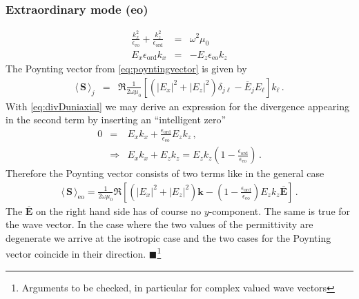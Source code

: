 \documentclass[12pt,a4paper,twoside,openright,BCOR10mm,headsepline,titlepage,abstracton,chapterprefix,final]{scrreprt}
\newcommand\Vector[1]{{\mathbf{#1}}}
\newcommand\vacuum{0}
\newcommand\wavenumber{k}
\newcommand\Wavevector{\Vector{\wavenumber}}
\newcommand\scalarEfield{E}
\newcommand\Efield{\Vector{\scalarEfield}}
\newcommand\vacuumpermeability{\mu_{\vacuum}}
\newcommand\scalarpermittivity{\epsilon}
\newcommand\ordi{\text{ord}}
\newcommand\eo{\text{eo}}
\newcommand{\timeavg}[1]{{\langle\,#1\,\rangle}}
\newcommand{\remark}[1]{{\color{red}$\blacksquare$}\footnote{{\color{red}#1}}}
\begin{document}
\subsubsection{Extraordinary mode (eo)}
\begin{eqnarray}
  \frac{\wavenumber_{x}^2 }{\scalarpermittivity_{\eo} } + \frac{\wavenumber_{z}^2 }{\scalarpermittivity_{\ordi} } &=& \omega^2 \vacuumpermeability 
  \label{eq:uniaxialAnisotropicDispersion}
  \\
  \scalarEfield_x \scalarpermittivity_{\ordi} \wavenumber_x &=& -  \scalarEfield_z \scalarpermittivity_{\eo} \wavenumber_z \label{eq:divDuniaxial}
\end{eqnarray}
The Poynting vector from \eqref{eq:poyntingvector} is given by
\begin{eqnarray}
 \timeavg{\Vector{S}}_j &=&  \Re\frac{1}{2 \omega \vacuumpermeability}\left[ (|\scalarEfield_x|^2 + |\scalarEfield_z|^2) \delta_{j\ell}  - \overline{\scalarEfield}_j \scalarEfield_\ell \right] k_\ell\,.
\end{eqnarray}
With \eqref{eq:divDuniaxial} we may derive an expression for the divergence appearing in the second term by inserting an ``intelligent zero''
\begin{eqnarray}
 0 &=& \scalarEfield_x \wavenumber_x + \frac{\scalarpermittivity_{\ordi}}{\scalarpermittivity_\eo} \scalarEfield_z \wavenumber_z\,,\nonumber\\
&\Rightarrow& \scalarEfield_x \wavenumber_x + \scalarEfield_z \wavenumber_z = \scalarEfield_z \wavenumber_z \left(1 - \frac{\scalarpermittivity_{\ordi}}{\scalarpermittivity_\eo}\right)\,. \label{eq:divEviolation}
\end{eqnarray}
Therefore the Poynting vector consists of two terms like in the general case
\begin{eqnarray}
  \timeavg{\Vector{S}}_\eo = \frac{ 1 }{ 2\omega\vacuumpermeability } \Re 
  \left[
      (|\scalarEfield_x|^2 + |\scalarEfield_z|^2)\Wavevector
      - \left(1 - \frac{\scalarpermittivity_{\ordi}}{\scalarpermittivity_\eo}\right)\scalarEfield_z \wavenumber_z \overline{\Efield}
  \right]\,.\label{eq:Suniaxialeo}
\end{eqnarray}
The $\overline{\Efield}$ on the right hand side has of course no $y$-component. The same is true for the wave vector.
In the case where the two values of the permittivity are degenerate we arrive at the isotropic case and the two cases for the
Poynting vector coincide in their direction.
\remark{Arguments to be checked, in particular for complex valued wave vectors}
\end{document}
